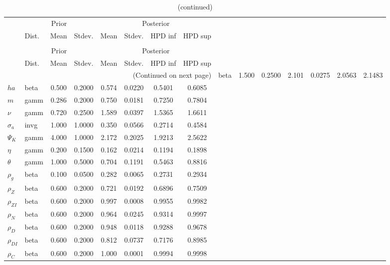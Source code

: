  
\begin{center}
\begin{longtable}{llcccccc} 
\caption{Results from Metropolis-Hastings (parameters)}
 \label{Table:MHPosterior:1}\\
\toprule 
  & \multicolumn{3}{c}{Prior}  &  \multicolumn{4}{c}{Posterior} \\
  \cmidrule(r{.75em}){2-4} \cmidrule(r{.75em}){5-8}
  & Dist. & Mean  & Stdev. & Mean & Stdev. & HPD inf & HPD sup\\
\midrule \endfirsthead 
\caption{(continued)}\\\toprule 
  & \multicolumn{3}{c}{Prior}  &  \multicolumn{4}{c}{Posterior} \\
  \cmidrule(r{.75em}){2-4} \cmidrule(r{.75em}){5-8}
  & Dist. & Mean  & Stdev. & Mean & Stdev. & HPD inf & HPD sup\\
\midrule \endhead 
\bottomrule \multicolumn{8}{r}{(Continued on next page)} \endfoot 
\bottomrule \endlastfoot 
${\gamma}$ & beta &   1.500 & 0.2500 &   2.101& 0.0275 &  2.0563 &  2.1483 \\ 
${ha}$ & beta &   0.500 & 0.2000 &   0.574& 0.0220 &  0.5401 &  0.6085 \\ 
${m}$ & gamm &   0.286 & 0.2000 &   0.750& 0.0181 &  0.7250 &  0.7804 \\ 
$\nu$ & gamm &   0.720 & 0.2500 &   1.589& 0.0397 &  1.5365 &  1.6611 \\ 
${\sigma_a}$ & invg &   1.000 & 1.0000 &   0.350& 0.0566 &  0.2714 &  0.4584 \\ 
${\Psi_K}$ & gamm &   4.000 & 1.0000 &   2.172& 0.2025 &  1.9213 &  2.5622 \\ 
${\eta}$ & gamm &   0.200 & 0.1500 &   0.162& 0.0214 &  0.1194 &  0.1898 \\ 
${\theta}$ & gamm &   1.000 & 0.5000 &   0.704& 0.1191 &  0.5463 &  0.8816 \\ 
${\rho_g}$ & beta &   0.100 & 0.0500 &   0.282& 0.0065 &  0.2731 &  0.2934 \\ 
${\rho_Z}$ & beta &   0.600 & 0.2000 &   0.721& 0.0192 &  0.6896 &  0.7509 \\ 
${\rho_{ZI}}$ & beta &   0.600 & 0.2000 &   0.997& 0.0008 &  0.9955 &  0.9982 \\ 
${\rho_N}$ & beta &   0.600 & 0.2000 &   0.964& 0.0245 &  0.9314 &  0.9997 \\ 
${\rho_D}$ & beta &   0.600 & 0.2000 &   0.948& 0.0118 &  0.9288 &  0.9678 \\ 
${\rho_{DI}}$ & beta &   0.600 & 0.2000 &   0.812& 0.0737 &  0.7176 &  0.8985 \\ 
${\rho_C}$ & beta &   0.600 & 0.2000 &   1.000& 0.0001 &  0.9994 &  0.9998 \\ 
\end{longtable}
 \end{center}
